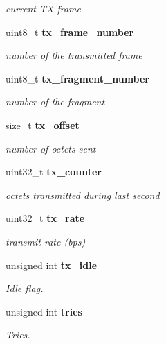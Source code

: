 \begin{DoxyCompactItemize}
\begin{DoxyCompactList}\small\item\em current \-T\-X frame \end{DoxyCompactList}\item 
uint8\-\_\-t {\bf tx\-\_\-frame\-\_\-number}\label{structec__eoe_aa662995414d6117c623a67d7d3807bfc}

\begin{DoxyCompactList}\small\item\em number of the transmitted frame \end{DoxyCompactList}\item 
uint8\-\_\-t {\bf tx\-\_\-fragment\-\_\-number}\label{structec__eoe_a3ee417a7b394d57b0ba1e7513e24f8b6}

\begin{DoxyCompactList}\small\item\em number of the fragment \end{DoxyCompactList}\item 
size\-\_\-t {\bf tx\-\_\-offset}\label{structec__eoe_a77e698a64338945f1c57b75771881255}

\begin{DoxyCompactList}\small\item\em number of octets sent \end{DoxyCompactList}\item 
uint32\-\_\-t {\bf tx\-\_\-counter}\label{structec__eoe_aacdbf76b955e5aeb7f1d627a2ca93af5}

\begin{DoxyCompactList}\small\item\em octets transmitted during last second \end{DoxyCompactList}\item 
uint32\-\_\-t {\bf tx\-\_\-rate}\label{structec__eoe_abfaa2eb7e9ff799e9872a49819177448}

\begin{DoxyCompactList}\small\item\em transmit rate (bps) \end{DoxyCompactList}\item 
unsigned int {\bf tx\-\_\-idle}
\begin{DoxyCompactList}\small\item\em \-Idle flag. \end{DoxyCompactList}\item 
unsigned int {\bf tries}
\begin{DoxyCompactList}\small\item\em \-Tries. \end{DoxyCompactList}\end{DoxyCompactItemize}


